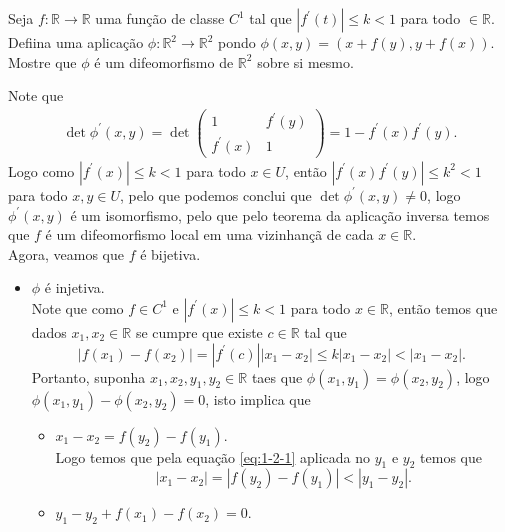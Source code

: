 \begin{homeworkProblem}[Seção 1-2]
  Seja $f:\mathbb{R}\to\mathbb{R}$ uma função de classe $C^{1}$ tal que $|f^{\prime}(t)|\leq k<1$ para todo $\in\mathbb{R}$. Defiina uma aplicação $\phi:\mathbb{R}^{2}\to\mathbb{R}^{2}$ pondo $\phi(x,y)=(x+f(y),y+f(x))$. Mostre que $\phi$ é um difeomorfismo de $\mathbb{R}^{2}$ sobre si mesmo.
  \begin{solution}
    Note que
    \begin{align*}
      \det \phi^{\prime}(x,y)=\det \begin{pmatrix}
        1 & f^{\prime}(y) \\
        f^{\prime}(x) & 1
      \end{pmatrix}=1-f^{\prime}(x)f^{\prime}(y).
    \end{align*}
    Logo como $|f^{\prime}(x)|\leq k<1$ para todo $x\in U$, então $|f^{\prime}(x)f^{\prime}(y)|\leq k^{2}<1$ para todo $x,y\in U$, pelo que podemos conclui que $\det\phi^{\prime}(x,y)\neq 0$, logo $\phi^{\prime}(x,y)$ é um isomorfismo, pelo que pelo teorema da aplicação inversa temos que $f$ é um difeomorfismo local em uma vizinhançã de cada $x\in \mathbb{R}$.\\
    Agora, veamos que $f$ é bijetiva.
    \begin{itemize}
      \item $\phi$ é injetiva.\\
        Note que como $f\in C^{1}$ e $|f^{\prime}(x)|\leq k<1$ para todo $x\in \mathbb{R}$, então temos que dados $x_1,x_2\in \mathbb{R}$ se cumpre que existe $c\in \mathbb{R}$ tal que 
        \begin{equation}\label{eq:1-2-1}
          |f(x_1)-f(x_2)|=|f^{\prime}(c)||x_1-x_2|\leq k|x_1-x_2|< |x_1-x_2|.
        \end{equation}
        Portanto, suponha $x_1,x_2,y_1,y_2\in \mathbb{R}$ taes que $\phi(x_1,y_1)=\phi(x_2,y_2)$, logo $\phi(x_1,y_1)-\phi(x_2,y_2)=0$, isto implica que
        \begin{itemize}
          \item $x_1-x_2=f(y_2)-f(y_1)$.\\
            Logo temos que pela equação \eqref{eq:1-2-1} aplicada no $y_1$ e $y_2$ temos que 
            \begin{equation}\label{eq:1-2-2}
              |x_1-x_2|=|f(y_2)-f(y_1)|< |y_1-y_2|.
            \end{equation}
          \item $y_1-y_2+f(x_1)-f(x_2)=0$.\\

\end{itemize}
\end{itemize}
\end{solution}
\end{homeworkProblem}
